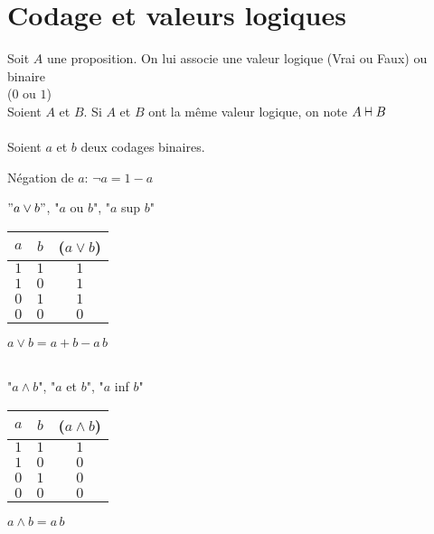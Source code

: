 \documentclass[12pt,twoside,a4paper]{article}
\author{MPSI 2}
\newcommand{\vdashv}{\mathrel{\text{\ooalign{$\vdash$\cr$\dashv$\cr}}}}
\begin{document}
	\maketitle
	\section{Codage et valeurs logiques}
		Soit $A$ une proposition. On lui associe une valeur logique (Vrai ou Faux) ou binaire \\($0$ ou $1$)
		\\
		Soient $A$ et $B$. Si $A$ et $B$ ont la m\^eme valeur logique, on note $A\vdashv B$\\
		\\
		Soient $a$ et $b$ deux codages binaires.
		\begin{liste}
			\item N\'egation de $a$: $\neg a=1-a$\\
			\item $"a\vee b"$, "$a$ ou $b$", "$a$ sup $b$"\\
				\begin{tabular}{ c | c | c  }
					$a$ & $b$ &($a\vee b$)\\\hline 
					$1$&$1$&$1$\\
					$1$&$0$&$1$\\
					$0$&$1$&$1$\\
					$0$&$0$&$0$\\
				\end{tabular}
				$a\vee b=a+b-a\,b$\\\\
			\item "$a\land b$", "$a$ et $b$", "$a$ inf $b$"\\
				\begin{tabular}{ c | c | c  }
					$a$ & $b$ &($a\land b$)\\\hline 
					$1$&$1$&$1$\\
					$1$&$0$&$0$\\
					$0$&$1$&$0$\\
					$0$&$0$&$0$\\
				\end{tabular}
				$a\land b=a\,b$
		\end{liste}
\end{document}
